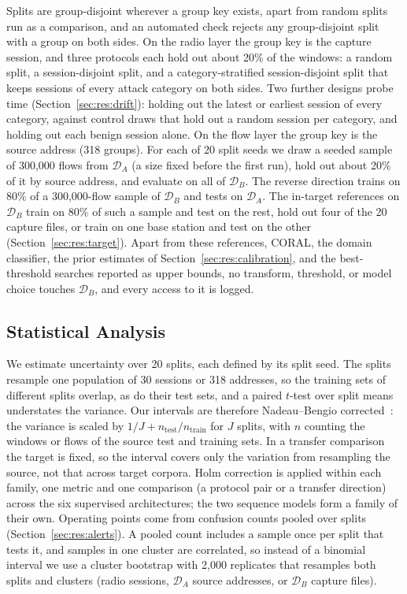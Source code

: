 \documentclass{ieeeaccess}
\newcommand{\DA}{\ensuremath{\mathcal{D}_{A}}}
\newcommand{\DB}{\ensuremath{\mathcal{D}_{B}}}
\begin{document}
Splits are group-disjoint wherever a group key exists, apart from random splits run as a comparison, and an automated check rejects any group-disjoint split with a group on both sides. On the radio layer the group key is the capture session, and three protocols each hold out about 20\% of the windows: a random split, a session-disjoint split, and a category-stratified session-disjoint split that keeps sessions of every attack category on both sides. Two further designs probe time (Section~\ref{sec:res:drift}): holding out the latest or earliest session of every category, against control draws that hold out a random session per category, and holding out each benign session alone. On the flow layer the group key is the source address (318 groups). For each of 20 split seeds we draw a seeded sample of 300,000 flows from \DA{} (a size fixed before the first run), hold out about 20\% of it by source address, and evaluate on all of \DB{}. The reverse direction trains on 80\% of a 300,000-flow sample of \DB{} and tests on \DA{}. The in-target references on \DB{} train on 80\% of such a sample and test on the rest, hold out four of the 20 capture files, or train on one base station and test on the other (Section~\ref{sec:res:target}). Apart from these references, CORAL, the domain classifier, the prior estimates of Section~\ref{sec:res:calibration}, and the best-threshold searches reported as upper bounds, no transform, threshold, or model choice touches \DB{}, and every access to it is logged.

\subsection{Statistical Analysis}

We estimate uncertainty over 20 splits, each defined by its split seed. The splits resample one population of 30 sessions or 318 addresses, so the training sets of different splits overlap, as do their test sets, and a paired $t$-test over split means understates the variance. Our intervals are therefore Nadeau--Bengio corrected~\cite{nadeau2003inference}: the variance is scaled by $1/J + n_{\mathrm{test}}/n_{\mathrm{train}}$ for $J$ splits, with $n$ counting the windows or flows of the source test and training sets. In a transfer comparison the target is fixed, so the interval covers only the variation from resampling the source, not that across target corpora. Holm correction is applied within each family, one metric and one comparison (a protocol pair or a transfer direction) across the six supervised architectures; the two sequence models form a family of their own. Operating points come from confusion counts pooled over splits (Section~\ref{sec:res:alerts}). A pooled count includes a sample once per split that tests it, and samples in one cluster are correlated, so instead of a binomial interval we use a cluster bootstrap with 2,000 replicates that resamples both splits and clusters (radio sessions, \DA{} source addresses, or \DB{} capture files).
\end{document}

